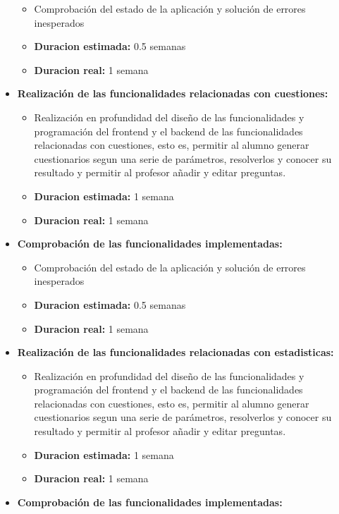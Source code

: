 \documentclass[openright,twoside,10pt]{book}
\providecommand{\tightlist}{%
  \setlength{\itemsep}{0pt}\setlength{\parskip}{0pt}}
\begin{document}
\begin{itemize}
      \begin{itemize}
      \tightlist
      \item
        Comprobación del estado de la aplicación y solución de errores
        inesperados
      \item
        \textbf{Duracion estimada:} 0.5 semanas
      \item
        \textbf{Duracion real:} 1 semana
      \end{itemize}
    \item
      \textbf{Realización de las funcionalidades relacionadas con
      cuestiones:}
    
      \begin{itemize}
      \tightlist
      \item
        Realización en profundidad del diseño de las funcionalidades y
        programación del frontend y el backend de las funcionalidades
        relacionadas con cuestiones, esto es, permitir al alumno generar
        cuestionarios segun una serie de parámetros, resolverlos y conocer
        su resultado y permitir al profesor añadir y editar preguntas.
      \item
        \textbf{Duracion estimada:} 1 semana
      \item
        \textbf{Duracion real:} 1 semana
      \end{itemize}
    \item
      \textbf{Comprobación de las funcionalidades implementadas:}
    
      \begin{itemize}
      \tightlist
      \item
        Comprobación del estado de la aplicación y solución de errores
        inesperados
      \item
        \textbf{Duracion estimada:} 0.5 semanas
      \item
        \textbf{Duracion real:} 1 semana
      \end{itemize}
    \item
      \textbf{Realización de las funcionalidades relacionadas con
      estadisticas:}
    
      \begin{itemize}
      \tightlist
      \item
        Realización en profundidad del diseño de las funcionalidades y
        programación del frontend y el backend de las funcionalidades
        relacionadas con cuestiones, esto es, permitir al alumno generar
        cuestionarios segun una serie de parámetros, resolverlos y conocer
        su resultado y permitir al profesor añadir y editar preguntas.
      \item
        \textbf{Duracion estimada:} 1 semana
      \item
        \textbf{Duracion real:} 1 semana
      \end{itemize}
    \item
      \textbf{Comprobación de las funcionalidades implementadas:}
    

\end{itemize}
\end{document}
